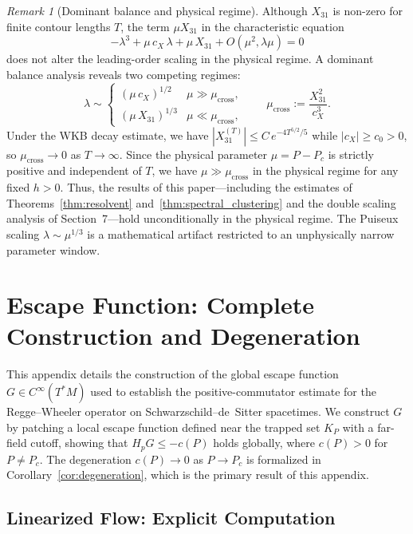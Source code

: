 \documentclass[12pt,a4paper]{amsart}
\theoremstyle{remark}
\newtheorem{remark}[theorem]{Remark}
\begin{document}
\begin{remark}[Dominant balance and physical regime]
\label{rem:dominant_balance}
Although $X_{31}$ is non-zero for finite contour lengths $T$, the term $\mu X_{31}$ in the
characteristic equation
\[
  -\lambda^3 + \mu\,c_X\,\lambda + \mu\,X_{31} + O(\mu^2,\lambda\mu) = 0
\]
does not alter the leading-order scaling in the physical regime.
A dominant balance analysis reveals two competing regimes:
\[
  \lambda \sim
  \begin{cases}
    (\mu\,c_X)^{1/2} & \mu \gg \mu_{\mathrm{cross}}, \\
    (\mu\,X_{31})^{1/3} & \mu \ll \mu_{\mathrm{cross}},
  \end{cases}
  \qquad
  \mu_{\mathrm{cross}} := \frac{X_{31}^2}{c_X^3}.
\]
Under the WKB decay estimate, we have $|X_{31}^{(T)}| \leq C\,e^{-4T^{5/2}/5}$ while $|c_X| \geq c_0 > 0$,
so $\mu_{\mathrm{cross}} \to 0$ as $T \to \infty$.
Since the physical parameter $\mu = P - P_c$ is strictly positive and
independent of $T$, we have $\mu \gg \mu_{\mathrm{cross}}$ in the physical regime
for any fixed $h > 0$.
Thus, the results of this paper---including the estimates of Theorems~\ref{thm:resolvent}
and~\ref{thm:spectral_clustering} and the double scaling analysis of Section~7---hold
unconditionally in the physical regime.
The Puiseux scaling $\lambda \sim \mu^{1/3}$ is a mathematical artifact
restricted to an unphysically narrow parameter window.
\end{remark}

\section{Escape Function: Complete Construction and Degeneration}
\label{app:escape}

This appendix details the construction of the global escape function $G \in C^\infty(T^*M)$
used to establish the positive-commutator estimate for the Regge--Wheeler
operator on Schwarzschild--de~Sitter spacetimes. We construct $G$ by patching
a local escape function defined near the trapped set $K_P$ with a far-field cutoff,
showing that $H_p G \leq -c(P)$ holds globally, where $c(P) > 0$ for $P \neq P_c$.
The degeneration $c(P) \to 0$ as $P \to P_c$ is formalized in
Corollary~\ref{cor:degeneration}, which is the primary result of this appendix.

\subsection{Linearized Flow: Explicit Computation}
\end{document}
